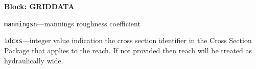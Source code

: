 \item \textbf{Block: GRIDDATA}

\begin{description}
\item \texttt{manningsn}---mannings roughness coefficient

\item \texttt{idcxs}---integer value indication the cross section identifier in the Cross Section Package that applies to the reach.  If not provided then reach will be treated as hydraulically wide.

\end{description}

